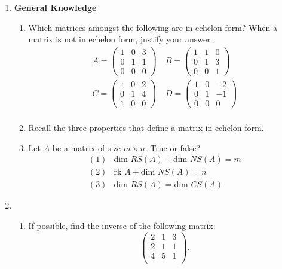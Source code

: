 \documentclass{article}
\begin{document}
\begin{enumerate}
\item \textbf{General Knowledge}
\begin{enumerate}
\item Which matrices amongst the following are in echelon form? When a matrix is not in echelon form, justify your answer.
 \[\begin{split}
 A =\begin{pmatrix} 1 & 0 & 3 \\ 0 & 1 & 1 \\ 0 & 0 & 0 \end{pmatrix} & \  B =\begin{pmatrix} 1 & 1 & 0 \\ 0 & 1 & 3 \\ 0 & 0 & 1 \end{pmatrix} \\
C =\begin{pmatrix} 1 & 0 & 2 \\ 0 & 1 & 4 \\ 1 & 0 & 0 \end{pmatrix}  & \  D =\begin{pmatrix} 1 & 0 & -2 \\ 0 & 1 & -1 \\ 0 & 0 & 0 \end{pmatrix} \\
\end{split}\]

\vskip 1in

\item Recall the three properties that define a matrix in echelon form. 

\vskip 3in

\item Let $A$ be a matrix of size $m\times n$. True or false? 
\[\begin{split}
(1) &  \text{dim } RS(A) + \text{dim }NS(A) = m \\ 
(2) &  \text{rk }A + \text{dim }NS(A) = n \\
(3) & \text{dim }RS(A) = \text{dim }CS(A) 
\end{split}\]
\end{enumerate}




\newpage

\item 
\begin{enumerate}
\item If possible, find the inverse of the following matrix:
\[\begin{pmatrix}
2 & 1 & 3 \\
2 & 1 & 1 \\
4 & 5 & 1 \\
\end{pmatrix}.\]


\end{enumerate}
\end{enumerate}
\end{document}
